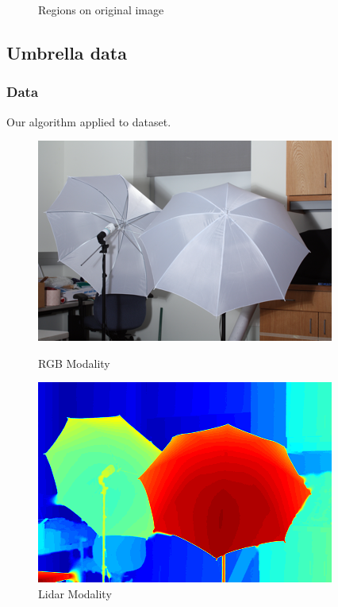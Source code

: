 \documentclass{beamer}
\begin{document}
\begin{frame}
\begin{figure}[ht]
\begin{minipage}[b]{0.45\linewidth}
      \caption{Regions on original image}
    \end{minipage}
  \end{figure}
\end{frame}


\subsection{Umbrella data}
\begin{frame}
  \frametitle{Data}
  Our algorithm applied to \cite{Scharstein2014} dataset.
  \begin{figure}[ht]
    \begin{minipage}[b]{0.45\linewidth}
      \centering
      \includegraphics[width=\textwidth]{./Images/Umbrella/optical.png}
      \caption{RGB Modality}
    \end{minipage}
    \begin{minipage}[b]{0.45\linewidth}
      \centering
      \includegraphics[width=\textwidth]{./Images/Umbrella/lidarColor.png}
      \caption{Lidar Modality}
    \end{minipage}
  \end{figure}
\end{frame}
\end{document}
